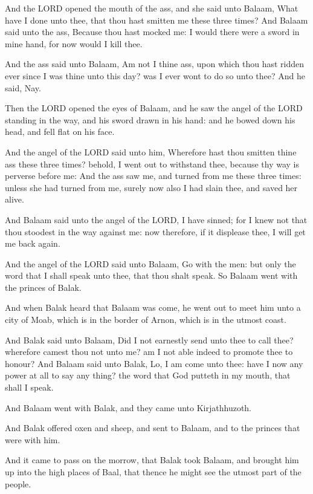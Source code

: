 \verse And the LORD opened the mouth of the ass, and she said unto
Balaam, What have I done unto thee, that thou hast smitten me these
three times?  \verse And Balaam said unto the ass, Because thou hast
mocked me: I would there were a sword in mine hand, for now would I
kill thee.

\verse And the ass said unto Balaam, Am not I thine ass, upon which
thou hast ridden ever since I was thine unto this day? was I ever wont
to do so unto thee? And he said, Nay.

\verse Then the LORD opened the eyes of Balaam, and he saw the angel of
the LORD standing in the way, and his sword drawn in his hand: and he
bowed down his head, and fell flat on his face.

\verse And the angel of the LORD said unto him, Wherefore hast thou
smitten thine ass these three times? behold, I went out to withstand
thee, because thy way is perverse before me: \verse And the ass saw me,
and turned from me these three times: unless she had turned from me,
surely now also I had slain thee, and saved her alive.

\verse And Balaam said unto the angel of the LORD, I have sinned; for I
knew not that thou stoodest in the way against me: now therefore, if
it displease thee, I will get me back again.

\verse And the angel of the LORD said unto Balaam, Go with the men: but
only the word that I shall speak unto thee, that thou shalt speak. So
Balaam went with the princes of Balak.

\verse And when Balak heard that Balaam was come, he went out to meet
him unto a city of Moab, which is in the border of Arnon, which is in
the utmost coast.

\verse And Balak said unto Balaam, Did I not earnestly send unto thee
to call thee? wherefore camest thou not unto me? am I not able indeed
to promote thee to honour?  \verse And Balaam said unto Balak, Lo, I am
come unto thee: have I now any power at all to say any thing? the word
that God putteth in my mouth, that shall I speak.

\verse And Balaam went with Balak, and they came unto Kirjathhuzoth.

\verse And Balak offered oxen and sheep, and sent to Balaam, and to the
princes that were with him.

\verse And it came to pass on the morrow, that Balak took Balaam, and
brought him up into the high places of Baal, that thence he might see
the utmost part of the people.


